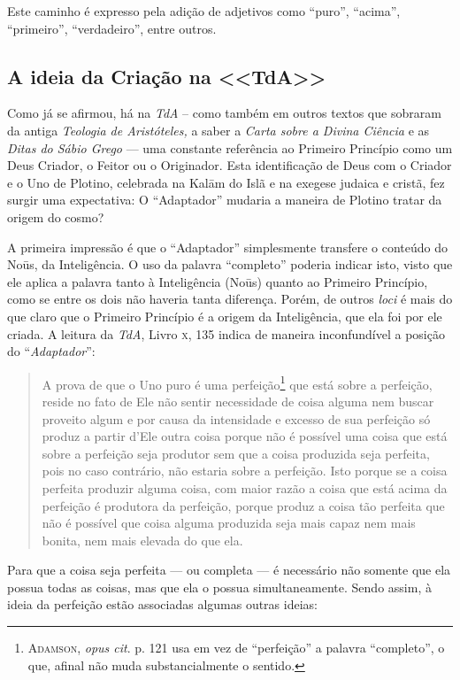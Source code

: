 Este caminho é expresso pela adição de adjetivos como “puro”,
“acima”, ``primeiro”, “verdadeiro”, entre outros.

\subsection{A ideia da Criação na <<TdA>>}

\emph{}Como já se afirmou, há na \emph{TdA}  -- como
também em outros textos que sobraram da antiga 
\emph{Teologia de Aristóteles,} a saber a \emph{Carta sobre
a Divina Ciência} e as \emph{Ditas do Sábio Grego} --- uma
constante referência ao Primeiro Princípio como um Deus Criador,
o Feitor ou o Originador. Esta identificação de Deus com o
Criador e o Uno de Plotino, celebrada na Kalām do Islã
e na exegese judaica e cristã, fez surgir uma expectativa: O
“Adaptador” mudaria a maneira de Plotino tratar da origem do
cosmo? 

A primeira impressão é que o “Adaptador” simplesmente
transfere o conteúdo do Noūs, da Inteligência. O uso da palavra
“completo” poderia indicar isto, visto que ele aplica a palavra
tanto à Inteligência (Noūs) quanto ao Primeiro Princípio, como
se entre os dois não haveria tanta diferença. Porém, de outros
\emph{loci} é mais do que claro que o Primeiro Princípio é a
origem da Inteligência, que ela foi por ele criada. A leitura da
\emph{TdA}, Livro \textsc{x},  135 indica de maneira inconfundível a
posição do ``\emph{Adaptador}”:

\begin{quote}
A prova de que o Uno puro é uma perfeição\footnote{
\textsc{Adamson},  \emph{opus cit}. p. 121 usa em vez de “perfeição”
a palavra  “completo”, o que, afinal não muda substancialmente o
sentido.}  que está sobre a perfeição, reside no fato de Ele
não sentir necessidade de coisa alguma nem buscar proveito algum
e por causa da intensidade e excesso de sua perfeição só produz
a partir d'Ele outra coisa porque não é possível uma coisa que
está sobre a perfeição seja produtor sem que a coisa produzida
seja perfeita, pois no caso contrário, não estaria sobre a
perfeição. Isto porque se a coisa perfeita produzir alguma
coisa, com maior razão a coisa que está acima da perfeição é
produtora da perfeição, porque produz a coisa tão perfeita que
não é possível que coisa alguma produzida seja mais capaz nem
mais bonita, nem mais elevada do que ela.  
\end{quote}

Para que a coisa seja perfeita --- ou completa --- é necessário não
somente que ela possua todas as coisas, mas que ela o possua
simultaneamente. Sendo assim, à ideia da perfeição estão
associadas algumas outras ideias: 

